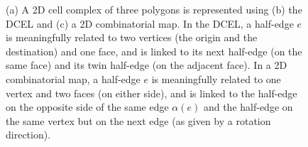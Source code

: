 \begin{figure}[tbp]
\centering
{}
\quad
{}
\quad
{}
\caption[A 2D cell complex as a DCEL and a 2D combinatorial map]{(a) A 2D cell complex of three polygons is represented using (b) the DCEL and (c) a 2D combinatorial map.
In the DCEL, a half-edge $e$ is meaningfully related to two vertices (the origin and the destination) and one face, and is linked to its next half-edge (on the same face) and its twin half-edge (on the adjacent face).
In a 2D combinatorial map, a half-edge $e$ is meaningfully related to one vertex and two faces (on either side), and is linked to the half-edge on the opposite side of the same edge $\alpha(e)$ and the half-edge on the same vertex but on the next edge (as given by a rotation direction).}
\label{fig:halfedge}
\end{figure}

